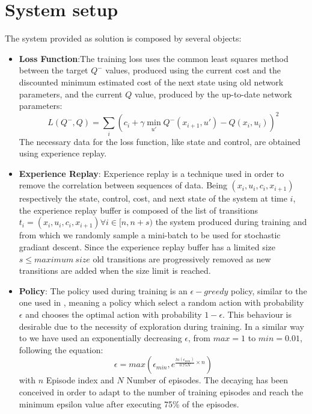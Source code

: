 \documentclass[twocolumn, a4paper]{article}
\begin{document}
\section{System setup}
The system provided as solution is composed by several objects:
\begin{itemize}
	\item \textbf{Loss Function}:The training loss uses the common least
		  squares method between the target \(Q^{-}\) values, produced using
		  the current cost and the discounted minimum estimated cost of the
		  next state using old network parameters, and the current \(Q\) value,
		  produced by the up-to-date network parameters:
		  \[L(Q^{-},Q)=\sum_{i}(c_{i}+\gamma\min_{u'}Q^{-}(x_{i+1},u')-Q(x_{i},
		  u_{i}))^{2}\]
		  The necessary data for the loss function, like state
		  and control, are obtained using experience replay.
	\item \textbf{Experience Replay}: Experience replay is a technique used in
		  order to remove the correlation between sequences of data. Being
		  \((x_{i}, u_{i}, c_{i}, x_{i+1})\) respectively the state, control,
		  cost, and next state of the system at time \(i\), the experience
		  replay buffer is composed of the list of transitions
		  \({t_{i}=(x_{i}, u_{i}, c_{i}, x_{i+1}) \forall i\in [n, n+s)}\)
		  the system produced during training and from which we randomly
		  sample a mini-batch to be used for stochastic gradiant descent.
		  Since the experience replay buffer has a limited size
		  \(s\leq maximum\:size\) old transitions are progressively removed as
		  new transitions are added when the size limit is reached.
	\item \textbf{Policy}: The policy used during training is an
		  \(\epsilon-greedy\) policy, similar to the one used in \cite{Mnih},
		  meaning a policy which select a random action with probability
		  \(\epsilon\) and chooses the optimal action with probability
		  \(1-\epsilon\). This behaviour is desirable due to the necessity of
		  exploration during training. In a similar way to \cite{Mnih} we have
		  used an exponentially decreasing \(\epsilon\), from \(max=1\) to
		  \(min=0.01\), following the equation:
		  \[
		  	\epsilon=max(\epsilon_{min}, e^{\frac{ln(\epsilon_{min})}{0.75N}\times n})
		  \]
		  with $n$ Episode index and $N$ Number of episodes.
		  The decaying has been conceived in order to adapt to the number of
		  training episodes and reach the minimum epsilon value after executing
		  75\% of the episodes.
\end{itemize}
\end{document}
